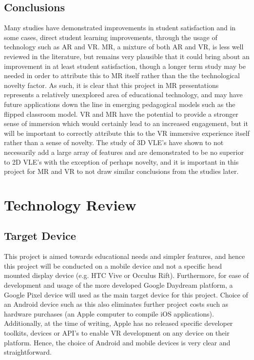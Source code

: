 \documentclass[11pt]{report}
\begin{document}
\section{Conclusions}
Many studies have demonstrated improvements in student satisfaction and in some cases, direct student learning improvements, through the usage of technology such as AR and VR. MR, a mixture of both AR and VR, is less well reviewed in the literature, but remains very plausible that it could bring about an improvement in at least student satisfaction, though a longer term study may be needed in order to attribute this to MR itself rather than the the technological novelty factor. As such, it is clear that this project in MR presentations represents a relatively unexplored area of educational technology, and may have future applications down the line in emerging pedagogical models such as the flipped classroom model. VR and MR have the potential to provide a stronger sense of immersion which would certainly lead to an increased engagement, but it will be important to correctly attribute this to the VR immersive experience itself rather than a sense of novelty. The study of 3D VLE's have shown to not necessarily add a large array of features and are demonstrated to be no superior to 2D VLE's with the exception of perhaps novelty, and it is important in this project for MR and VR to not draw similar conclusions from the studies later. 
\chapter{Technology Review}
\section{Target Device}
This project is aimed towards educational needs and simpler features, and hence this project will be conducted on a mobile device and not a specific head mounted display device (e.g. HTC Vive or Occulus Rift). Furthermore, for ease of development and usage of the more developed Google Daydream platform, a Google Pixel device will used as the main target device for this project. Choice of an Android device such as this also eliminates further project costs such as hardware purchases (an Apple computer to compile iOS applications). Additionally, at the time of writing, Apple has no released specific developer toolkits, devices or API's to enable VR development on any device on their platform. Hence, the choice of Android and mobile devices is very clear and straightforward.
\end{document}
